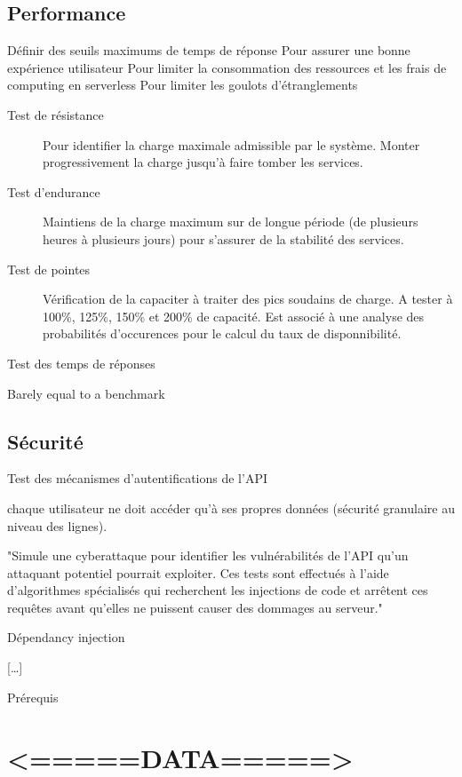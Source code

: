 \documentclass[a4paper,12pt]{article}
\begin{document}
\begin{multicols}{2}
\subsection*{Performance}
\label{sec:org931fe08}
Définir des seuils maximums de temps de réponse
Pour assurer une bonne expérience utilisateur
Pour limiter la consommation des ressources et les frais de computing en serverless
Pour limiter les goulots d'étranglements

\begin{description}
\item[{Test de résistance}] Pour identifier la charge maximale admissible par le système. Monter progressivement la charge jusqu'à faire tomber les services.
\item[{Test d'endurance}] Maintiens de la charge maximum sur de longue période (de plusieurs heures à plusieurs jours) pour s'assurer de la stabilité des services.
\item[{Test de pointes}] Vérification de la capaciter à traiter des pics soudains de charge. A tester à 100\%, 125\%, 150\% et 200\% de capacité. Est associé à une analyse des probabilités d'occurences pour le calcul du taux de disponnibilité.
\item[{Test des temps de réponses}] 
\end{description}

Barely equal to a benchmark
\subsection*{Sécurité}
\label{sec:org6cebf9d}
\begin{description}
\item[{Test d'autenticité}] Test des mécanismes d'autentifications de l'API
\item[{Test d'autorisation}] chaque utilisateur ne doit accéder qu'à ses propres données (sécurité granulaire au niveau des lignes).
\item[{Test de pénétration}] "Simule une cyberattaque pour identifier les vulnérabilités de l'API qu'un attaquant potentiel pourrait exploiter. Ces tests sont effectués à l'aide d'algorithmes spécialisés qui recherchent les injections de code et arrêtent ces requêtes avant qu'elles ne puissent causer des dommages au serveur."
\item Dépendancy injection
\item {[}\ldots{}]
\end{description}

Prérequis
\section*{<=====DATA=====>}
\label{sec:org6e9ae36}


\end{multicols}
\end{document}
